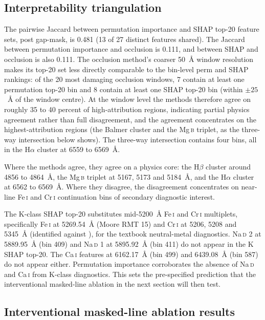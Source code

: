 \documentclass[11pt,a4paper]{article}
\newcommand{\Halpha}{H$\alpha$\xspace}
\newcommand{\Hbeta}{H$\beta$\xspace}
\newcommand{\Mgb}{Mg\,\textsc{b}\xspace}
\newcommand{\NaD}{Na\,\textsc{d}\xspace}
\newcommand{\CaI}{Ca\,\textsc{i}\xspace}
\newcommand{\FeI}{Fe\,\textsc{i}\xspace}
\newcommand{\CrI}{Cr\,\textsc{i}\xspace}
\begin{document}
\subsection{Interpretability triangulation}

The pairwise Jaccard between permutation importance and SHAP top-20 feature sets, post gap-mask, is 0.481 (13 of 27 distinct features shared). The Jaccard between permutation importance and occlusion is 0.111, and between SHAP and occlusion is also 0.111. The occlusion method's coarser 50~\AA{} window resolution makes its top-20 set less directly comparable to the bin-level perm and SHAP rankings: of the 20 most damaging occlusion windows, 7 contain at least one permutation top-20 bin and 8 contain at least one SHAP top-20 bin (within $\pm 25$~\AA{} of the window centre). At the window level the methods therefore agree on roughly 35 to 40 percent of high-attribution regions, indicating partial physics agreement rather than full disagreement, and the agreement concentrates on the highest-attribution regions (the Balmer cluster and the \Mgb triplet, as the three-way intersection below shows). The three-way intersection contains four bins, all in the \Halpha cluster at 6559 to 6569~\AA{}.

Where the methods agree, they agree on a physics core: the \Hbeta cluster around 4856 to 4864~\AA{}, the \Mgb triplet at 5167, 5173 and 5184~\AA{}, and the \Halpha cluster at 6562 to 6569~\AA{}. Where they disagree, the disagreement concentrates on near-line \FeI and \CrI continuation bins of secondary diagnostic interest.

The K-class SHAP top-20 substitutes mid-5200~\AA{} \FeI and \CrI multiplets, specifically \FeI at 5269.54~\AA{} (Moore RMT 15) and \CrI at 5206, 5208 and 5345~\AA{} (identified against \citet{GrayCorbally2009}), for the textbook neutral-metal diagnostics. \NaD2 at 5889.95~\AA{} (bin 409) and \NaD1 at 5895.92~\AA{} (bin 411) do not appear in the K SHAP top-20. The \CaI features at 6162.17~\AA{} (bin 499) and 6439.08~\AA{} (bin 587) do not appear either. Permutation importance corroborates the absence of \NaD and \CaI from K-class diagnostics. This sets the pre-specified prediction that the interventional masked-line ablation in the next section will then test.

\subsection{Interventional masked-line ablation results}
\label{subsec:results-ablation}
\end{document}
